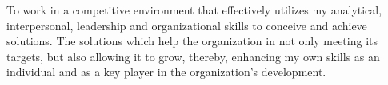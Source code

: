To work in a competitive environment that effectively utilizes my analytical,
interpersonal, leadership and organizational skills to conceive and achieve
solutions. The solutions which help the organization in not only meeting its
targets, but also allowing it to grow, thereby, enhancing my own skills as an
individual and as a key player in the organization's development.
